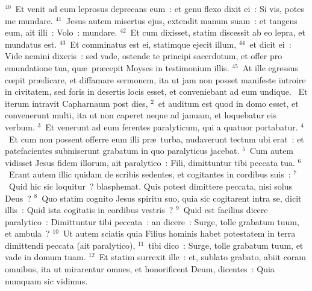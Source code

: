 ${}^{40}$~Et venit ad eum leprosus deprecans eum~: et genu flexo dixit ei~: Si vis, potes me mundare.
${}^{41}$~Jesus autem misertus ejus, extendit manum suam~: et tangens eum, ait illi~: Volo~: mundare.
${}^{42}$~Et cum dixisset, statim discessit ab eo lepra, et mundatus est.
${}^{43}$~Et comminatus est ei, statimque ejecit illum,
${}^{44}$~et dicit ei~: Vide nemini dixeris~: sed vade, ostende te principi sacerdotum, et offer pro emundatione tua, qu\ae\ pr\ae cepit Moyses in testimonium illis.
${}^{45}$~At ille egressus cœpit pr\ae dicare, et diffamare sermonem, ita ut jam non posset manifeste introire in civitatem, sed foris in desertis locis esset, et conveniebant ad eum undique.
~Et iterum intravit Capharnaum post dies,
${}^{2}$~et auditum est quod in domo esset, et convenerunt multi, ita ut non caperet neque ad januam, et loquebatur eis verbum.
${}^{3}$~Et venerunt ad eum ferentes paralyticum, qui a quatuor portabatur.
${}^{4}$~Et cum non possent offerre eum illi pr\ae\ turba, nudaverunt tectum ubi erat~: et patefacientes submiserunt grabatum in quo paralyticus jacebat.
${}^{5}$~Cum autem vidisset Jesus fidem illorum, ait paralytico~: Fili, dimittuntur tibi peccata tua.
${}^{6}$~Erant autem illic quidam de scribis sedentes, et cogitantes in cordibus suis~:
${}^{7}$~Quid hic sic loquitur~? blasphemat. Quis potest dimittere peccata, nisi solus Deus~?
${}^{8}$~Quo statim cognito Jesus spiritu suo, quia sic cogitarent intra se, dicit illis~: Quid ista cogitatis in cordibus vestris~?
${}^{9}$~Quid est facilius dicere paralytico~: Dimittuntur tibi peccata~: an dicere~: Surge, tolle grabatum tuum, et ambula~?
${}^{10}$~Ut autem sciatis quia Filius hominis habet potestatem in terra dimittendi peccata (ait paralytico),
${}^{11}$~tibi dico~: Surge, tolle grabatum tuum, et vade in domum tuam.
${}^{12}$~Et statim surrexit ille~: et, sublato grabato, abiit coram omnibus, ita ut mirarentur omnes, et honorificent Deum, dicentes~: Quia numquam sic vidimus.


